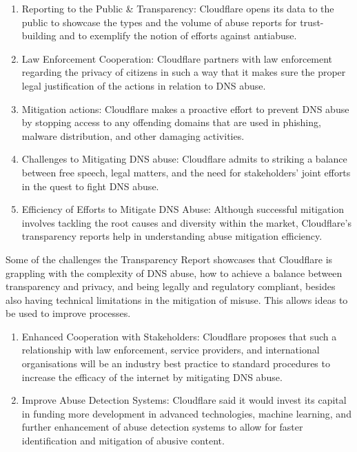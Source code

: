 \begin{enumerate}
\begin{enumerate}
\item Reporting to the Public \& Transparency: Cloudflare opens its data to the public to showcase the types and the volume of abuse reports for trust-building and to exemplify the notion of efforts against antiabuse.

\item Law Enforcement Cooperation: Cloudflare partners with law enforcement regarding the privacy of citizens in such a way that it makes sure the proper legal justification of the actions in relation to DNS abuse.


\item Mitigation actions: Cloudflare makes a proactive effort to prevent DNS abuse by stopping access to any offending domains that are used in phishing, malware distribution, and other damaging activities.

\item Challenges to Mitigating DNS abuse: Cloudflare admits to striking a balance between free speech, legal matters, and the need for stakeholders' joint efforts in the quest to fight DNS abuse.

\item Efficiency of Efforts to Mitigate DNS Abuse: Although successful mitigation involves tackling the root causes and diversity within the market, Cloudflare's transparency reports help in understanding abuse mitigation efficiency.

\end{enumerate}

Some of the challenges the Transparency Report showcases that Cloudflare is grappling with the complexity of DNS abuse, how to achieve a balance between transparency and privacy, and being legally and regulatory compliant, besides also having technical limitations in the mitigation of misuse. This allows ideas to be used to improve processes.

\begin{enumerate}
    \item Enhanced Cooperation with Stakeholders: Cloudflare proposes that such a relationship with law enforcement, service providers, and international organisations will be an industry best practice to standard procedures to increase the efficacy of the internet by mitigating DNS abuse.
    
    \item Improve Abuse Detection Systems: Cloudflare said it would invest its capital in funding more development in advanced technologies, machine learning, and further enhancement of abuse detection systems to allow for faster identification and mitigation of abusive content.
    

\end{enumerate}
\end{enumerate}
